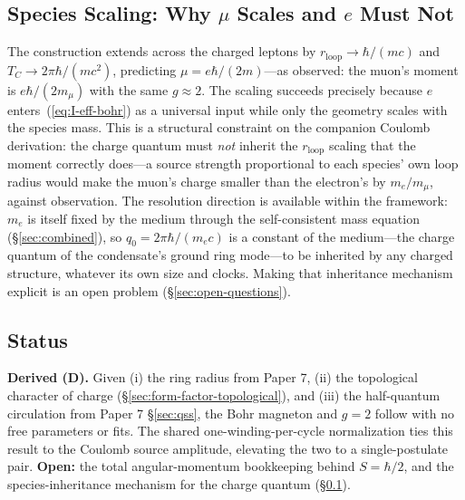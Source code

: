 \subsection{Species Scaling: Why $\mu$ Scales and $e$ Must Not}
\label{sec:species-scaling}

The construction extends across the charged leptons by
$r_{\text{loop}} \to \hbar/(m c)$ and $T_C \to 2\pi\hbar/(m c^2)$,
predicting $\mu = e\hbar/(2m)$---as observed: the muon's moment is
$e\hbar/(2m_\mu)$ with the same $g \approx 2$. The scaling succeeds
precisely because $e$ enters~(\ref{eq:I-eff-bohr}) as a universal input
while only the geometry scales with the species mass. This is a
structural constraint on the companion Coulomb derivation: the charge
quantum must \emph{not} inherit the $r_{\text{loop}}$ scaling that the
moment correctly does---a source strength proportional to each
species' own loop radius would make the muon's charge smaller than the
electron's by $m_e/m_\mu$, against observation. The resolution
direction is available within the framework: $m_e$ is itself fixed by
the medium through the self-consistent mass equation
(§\ref{sec:combined}), so $q_0 = 2\pi\hbar/(m_e c)$ is a constant of
the medium---the charge quantum of the condensate's ground ring
mode---to be inherited by any charged structure, whatever its own size
and clocks. Making that inheritance mechanism explicit is an open
problem (§\ref{sec:open-questions}).

\subsection{Status}

\textbf{Derived (D).} Given (i) the ring radius from Paper 7,
(ii) the topological character of charge
(§\ref{sec:form-factor-topological}), and (iii) the half-quantum
circulation from Paper 7 §\ref{sec:qss}, the Bohr magneton and $g = 2$
follow with no free parameters or fits. The shared
one-winding-per-cycle normalization ties this result to the Coulomb
source amplitude, elevating the two to a single-postulate pair.
\textbf{Open:} the total angular-momentum bookkeeping behind
$S = \hbar/2$, and the species-inheritance mechanism for the charge
quantum (§\ref{sec:species-scaling}).
